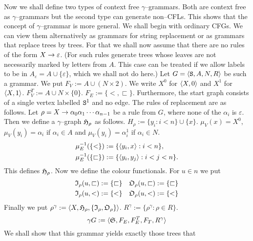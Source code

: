 Now we shall define two types of context free $\gamma$--grammars.
Both are context free as $\gamma$--grammars but the second type
can generate non--CFLs. This shows that the concept of 
$\gamma$--grammar is more general. We shall begin with ordinary 
CFGs. We can view them alternatively as
grammars for string replacement or as grammars that replace trees
by trees. For that we shall now assume that there are no rules of
the form $X \rightarrow \varepsilon$. (For such rules generate trees
whose leaves are not necessarily marked by letters from $A$. This
case can be treated if we allow labels to be in $A_{\varepsilon}
= A \cup \{\varepsilon\}$, which we shall not do here.) Let 
$G = \langle \mbox{\tt S}, A, N, R\rangle$ be such a grammar.
We put $F_V := A \cup (N \times 2)$.  We write $X^0$ for
$\langle X,0\rangle$ and $X^1$ for $\langle X,1\rangle$. $F_V^T := A \cup
N \times \{0\}$. $F_E := \{<, \sqsubset\}$. Furthermore, the
start graph consists of a single vertex labelled $\mbox{\tt S}^1$ 
and no edge. The rules of replacement are as follows.
Let $\rho = X \rightarrow \alpha_0 \alpha_1 \dotsb \alpha_{n-1}$
be a rule from $G$, where none of the $\alpha_i$ is $\varepsilon$.
Then we define a $\gamma$--graph $\mathfrak{H}_{\rho}$
as follows. $H_{\rho} := \{y_i : i < n\} \cup \{x\}$.
$\mu_V(x) = X^0$, $\mu_V(y_i) = \alpha_i$ if
$\alpha_i \in A$ and $\mu_V(y_i) = \alpha_i^1$ if
$\alpha_i \in N$. 
\begin{equation}
\begin{split}
\mu_E^{-1}(\{<\}) & := \{\langle y_i, x\rangle : i < n\},  \\
\mu_E^{-1}(\{\sqsubset\}) & := \{\langle y_i, y_j \rangle : i < j < n\}.
\end{split}
\end{equation}
This defines $\mathfrak{H}_{\rho}$. Now we define the colour functionals.
For $u \in n$ we put
\begin{equation}
\begin{split}
\mathfrak{I}_{\rho}(u, \sqsubset) & := \{\sqsubset\} & 
	 \mathfrak{O}_{\rho}(u, \sqsubset) & := \{\sqsubset\} \\
\mathfrak{I}_{\rho}(u, <)         & := \{<\} &
	\mathfrak{O}_{\rho}(u, <) & := \{<\}
\end{split}
\end{equation}
Finally we put $\rho^{\gamma} := \auf X, \GH_{\rho}, \{\GI_{\rho}, %
\GO_{\rho}\}\zu$. $R^{\gamma} := \{\rho^{\gamma} : \rho \in R\}$.
\begin{equation}
\gamma G := \langle \mathfrak{S}, F_E, F_E^T, F_T, R^{\gamma}\rangle 
\end{equation}
We shall show that this grammar yields exactly those trees that
